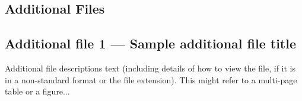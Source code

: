 \documentclass{bmcart}
\begin{document}
\begin{backmatter}

 
 


 

 
 

\section*{Additional Files}
  \subsection*{Additional file 1 --- Sample additional file title}
    Additional file descriptions text (including details of how to
    view the file, if it is in a non-standard format or the file extension).  This might
    refer to a multi-page table or a figure...
 

\end{backmatter}
\end{document}
